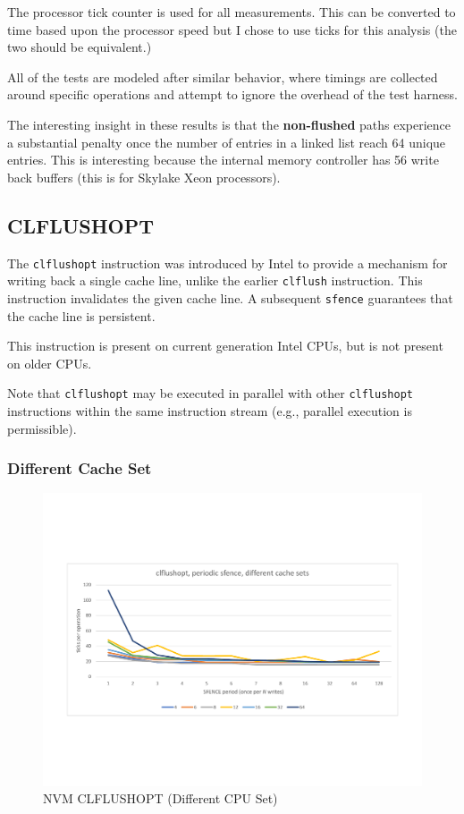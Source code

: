 The processor tick counter is used for all measurements.  This
can be converted to time based upon the processor speed but I
chose to use ticks for this analysis (the two should be 
equivalent.)

All of the tests are modeled after similar behavior, where
timings are collected around specific operations and attempt
to ignore the overhead of the test harness.

The interesting insight in these results is that the \textbf{non-flushed} paths experience
a substantial penalty once the number of entries in a linked 
list reach 64 unique entries.  This is interesting because the
internal memory controller has 56 write back buffers (this is
for Skylake Xeon processors).


\subsection{CLFLUSHOPT}\label{micro:sec:clflushopt}

The \texttt{clflushopt} instruction was introduced by Intel to provide a mechanism for writing back a single cache line, unlike
the earlier \texttt{clflush} instruction. This instruction
invalidates the given cache line.  A subsequent \texttt{sfence}
guarantees that the cache line is persistent.

This instruction is present on current generation Intel CPUs,
but is not present on older CPUs.

Note that \texttt{clflushopt} may be executed in parallel with
other \texttt{clflushopt} instructions within the same
instruction stream (e.g., parallel execution is permissible).

\subsubsection{Different Cache Set}\label{impl:mb:clflushopt:diffset}
\begin{figure}
    \centering
    \caption{NVM CLFLUSHOPT (Different CPU Set)}\label{micro:clflushopt:different}
    \includegraphics[scale=0.35]{micro/nvm-clflushopt-periodic-different.pdf}
\end{figure}

